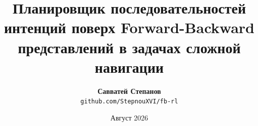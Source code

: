 \documentclass[10pt,twocolumn,letterpaper]{article}
\title{\LARGE \bfseries Планировщик последовательностей интенций поверх Forward-Backward представлений в задачах сложной навигации}
\author{\textbf{Савватей Степанов}  \\ \texttt{github.com/StepnouXVI/fb-rl}}
\date{Август 2026}
\begin{document}
\maketitle

\begin{abstract}
\end{abstract}









\end{document}
